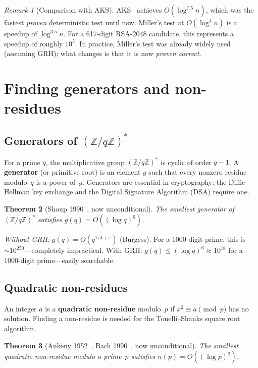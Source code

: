 \documentclass[11pt]{article}
\theoremstyle{plain}
\newtheorem{theorem}{Theorem}
\theoremstyle{definition}
\theoremstyle{remark}
\newtheorem{remark}[theorem]{Remark}
\begin{document}
\begin{remark}[Comparison with AKS]
AKS~\cite{AKS2004} achieves $O(\log^{7.5} n)$, which was the fastest
\emph{proven} deterministic test until now. Miller's test at
$O(\log^4 n)$ is a speedup of $\log^{3.5} n$. For a 617-digit
RSA-2048 candidate, this represents a speedup of roughly $10^{5}$.
In practice, Miller's test was already widely used (assuming GRH);
what changes is that it is now \emph{proven correct}.
\end{remark}


\section{Finding generators and non-residues}\label{sec:generators}

\subsection{Generators of $(\mathbb{Z}/q\mathbb{Z})^*$}

For a prime $q$, the multiplicative group $(\mathbb{Z}/q\mathbb{Z})^*$
is cyclic of order $q-1$. A \textbf{generator} (or primitive root) is
an element $g$ such that every nonzero residue modulo~$q$ is a power
of~$g$. Generators are essential in cryptography: the Diffie--Hellman
key exchange and the Digital Signature Algorithm (DSA) require one.

\begin{theorem}[Shoup 1990~\cite{Shoup1990}, now unconditional]\label{thm:shoup}
The smallest generator of $(\mathbb{Z}/q\mathbb{Z})^*$ satisfies
$g(q) = O((\log q)^6)$.
\end{theorem}

\emph{Without GRH:} $g(q) = O(q^{1/4+\varepsilon})$ (Burgess).
For a 1000-digit prime, this is $\sim 10^{250}$---completely
impractical. With GRH: $g(q) \leq (\log q)^6 \approx 10^{18}$
for a 1000-digit prime---easily searchable.

\subsection{Quadratic non-residues}

An integer $a$ is a \textbf{quadratic non-residue} modulo~$p$ if
$x^2 \equiv a \pmod{p}$ has no solution. Finding a non-residue is
needed for the Tonelli--Shanks square root algorithm.

\begin{theorem}[Ankeny 1952~\cite{Ankeny1952}, Bach 1990~\cite{Bach1990},
now unconditional]\label{thm:nonres}
The smallest quadratic non-residue modulo a prime~$p$ satisfies
$n(p) = O((\log p)^2)$.
\end{theorem}
\end{document}
